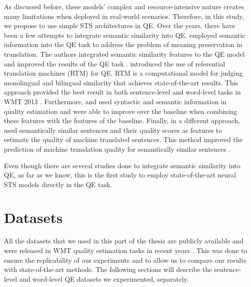 As discussed before, these models' complex and resource-intensive nature creates many limitations when deployed in real-world scenarios. Therefore, in this study, we propose to use simple STS architectures in QE. Over the years, there have been a few attempts to integrate semantic similarity into QE. \textcite{specia2011predicting} employed semantic information into the QE task to address the problem of meaning preservation in translation. The authors integrated semantic similarity features to the QE model and improved the results of the QE task \autocite{specia2011predicting}. \textcite{bicici-way-2014-referential} introduced the use of referential translation machines (RTM) for QE. RTM is a computational model for judging monolingual and bilingual similarity that achieves state-of-the-art results. This approach provided the best result in both sentence-level and word-level tasks in WMT 2013 \autocite{bojar-etal-2013-findings}. Furthermore, \textcite{kaljahi-etal-2014-syntax} and \textcite{camargo-de-souza-etal-2014-fbk} used syntactic and semantic information in quality estimation and were able to improve over the baseline when combining these features with the features of the baseline. Finally, in a different approach, \textcite{bechara-etal-2016-semantic} used semantically similar sentences and their quality scores as features to estimate the quality of machine translated sentences. This method improved the prediction of machine translation quality for semantically similar sentences \autocite{bechara-etal-2016-semantic}. 

Even though there are several studies done to integrate semantic similarity into QE, as far as we know, this is the first study to employ state-of-the-art neural STS models directly in the QE task. 

\section{Datasets}
\label{sec:qe_datasets}

 All the datasets that we used in this part of the thesis are publicly available and were released in WMT quality estimation tasks in recent years \autocite{specia-etal-2018-findings,fonseca-etal-2019-findings,specia-etal-2020-findings-wmt}. This was done to ensure the replicability of our experiments and to allow us to compare our results with state-of-the-art methods. The following sections will describe the sentence-level and word-level QE datasets we experimented, separately.

